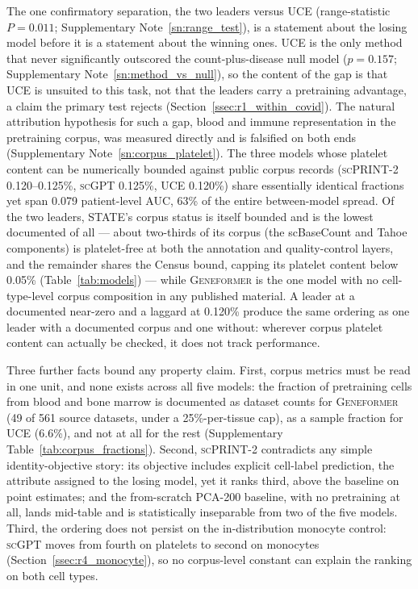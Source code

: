 \documentclass[11pt,a4paper]{article}
\newcommand{\model}[1]{\textsc{#1}}
\begin{document}
The one confirmatory separation, the two leaders versus \model{UCE}
(range-statistic $P = 0.011$; Supplementary Note~\ref{sn:range_test}), is a
statement about the losing model before it is a statement about the winning
ones. \model{UCE} is the only method that never significantly outscored the
count-plus-disease null model ($p = 0.157$;
Supplementary Note~\ref{sn:method_vs_null}), so the content of the gap is
that \model{UCE} is unsuited to this task, not that the leaders carry a
pretraining advantage, a claim the primary test rejects
(Section~\ref{ssec:r1_within_covid}). The natural attribution hypothesis for
such a gap, blood and immune representation in the pretraining corpus, was
measured directly and is falsified on both ends
(Supplementary Note~\ref{sn:corpus_platelet}). The three models whose
platelet content can be numerically bounded against public corpus records
(\model{scPRINT-2} 0.120--0.125\%, \model{scGPT} 0.125\%, \model{UCE}
0.120\%) share essentially identical fractions yet span 0.079 patient-level
AUC, 63\% of the entire between-model spread. Of the two leaders,
\model{STATE}'s corpus status is itself bounded and is the lowest documented
of all --- about two-thirds of its corpus (the scBaseCount and Tahoe
components) is platelet-free at both the annotation and quality-control
layers, and the remainder shares the Census bound, capping its platelet
content below 0.05\% (Table~\ref{tab:models}) --- while \model{Geneformer}
is the one model with no cell-type-level corpus composition in any published
material. A leader at a documented near-zero and a laggard at 0.120\%
produce the same ordering as one leader with a documented corpus and one
without: wherever corpus platelet content can actually be checked, it does
not track performance.

Three further facts bound any property claim. First, corpus metrics must be
read in one unit, and none exists across all five models: the fraction of
pretraining cells from blood and bone marrow is documented as dataset counts
for \model{Geneformer} (49 of 561 source datasets, under a 25\%-per-tissue
cap), as a sample fraction for \model{UCE} (6.6\%), and not at all for the
rest (Supplementary Table~\ref{tab:corpus_fractions}). Second,
\model{scPRINT-2} contradicts any simple identity-objective story: its
objective includes explicit cell-label prediction, the attribute assigned to
the losing model, yet it ranks third, above the baseline on point estimates;
and the from-scratch PCA-200 baseline, with no pretraining at all, lands
mid-table and is statistically inseparable from two of the five models.
Third, the ordering does not persist on the in-distribution monocyte control:
\model{scGPT} moves from fourth on platelets to second on monocytes
(Section~\ref{ssec:r4_monocyte}), so no corpus-level constant can explain the
ranking on both cell types.
\end{document}
